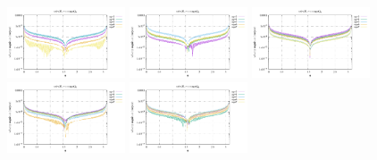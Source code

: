 \noindent
\includegraphics[width=3.5cm]{python_codes/fieldstone_152/RESULTS/exp1/vel_64_m2}
\includegraphics[width=3.5cm]{python_codes/fieldstone_152/RESULTS/exp1/vel_64_m3}
\includegraphics[width=3.5cm]{python_codes/fieldstone_152/RESULTS/exp1/vel_64_m4}
\includegraphics[width=3.5cm]{python_codes/fieldstone_152/RESULTS/exp1/vel_64_m5}
\includegraphics[width=3.5cm]{python_codes/fieldstone_152/RESULTS/exp1/vel_64_m6}

